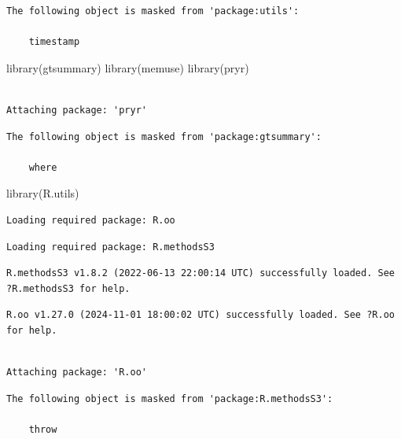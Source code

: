 \documentclass[
]{article}
\newenvironment{Shaded}{\begin{snugshade}}{\end{snugshade}}
\newcommand{\FunctionTok}[1]{\textcolor[rgb]{0.00,0.00,0.00}{#1}}
\newcommand{\NormalTok}[1]{\textcolor[rgb]{0.00,0.00,0.00}{#1}}
\begin{document}
\begin{verbatim}
The following object is masked from 'package:utils':

    timestamp
\end{verbatim}

\begin{Shaded}
\begin{Highlighting}[]
\FunctionTok{library}\NormalTok{(gtsummary)}
\FunctionTok{library}\NormalTok{(memuse)}
\FunctionTok{library}\NormalTok{(pryr)}
\end{Highlighting}
\end{Shaded}

\begin{verbatim}

Attaching package: 'pryr'
\end{verbatim}

\begin{verbatim}
The following object is masked from 'package:gtsummary':

    where
\end{verbatim}

\begin{Shaded}
\begin{Highlighting}[]
\FunctionTok{library}\NormalTok{(R.utils)}
\end{Highlighting}
\end{Shaded}

\begin{verbatim}
Loading required package: R.oo
\end{verbatim}

\begin{verbatim}
Loading required package: R.methodsS3
\end{verbatim}

\begin{verbatim}
R.methodsS3 v1.8.2 (2022-06-13 22:00:14 UTC) successfully loaded. See ?R.methodsS3 for help.
\end{verbatim}

\begin{verbatim}
R.oo v1.27.0 (2024-11-01 18:00:02 UTC) successfully loaded. See ?R.oo for help.
\end{verbatim}

\begin{verbatim}

Attaching package: 'R.oo'
\end{verbatim}

\begin{verbatim}
The following object is masked from 'package:R.methodsS3':

    throw
\end{verbatim}
\end{document}
